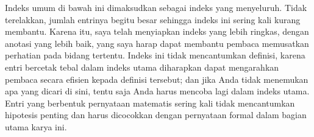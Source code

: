 Indeks umum di bawah ini dimaksudkan sebagai indeks yang menyeluruh.   Tidak terelakkan, jumlah entrinya begitu besar sehingga indeks ini sering kali kurang membantu.
Karena itu, saya telah menyiapkan indeks yang lebih ringkas,
dengan anotasi yang lebih baik, yang saya harap dapat membantu pembaca memusatkan perhatian pada bidang tertentu.   Indeks ini tidak mencantumkan definisi, karena entri
bercetak tebal dalam indeks utama diharapkan dapat mengarahkan pembaca secara efisien kepada definisi tersebut;  dan jika Anda tidak menemukan apa yang dicari di sini, tentu saja Anda harus mencoba lagi dalam indeks utama.
Entri yang berbentuk pernyataan matematis sering kali tidak mencantumkan hipotesis penting dan harus dicocokkan dengan pernyataan formal dalam bagian utama karya ini.
































































































